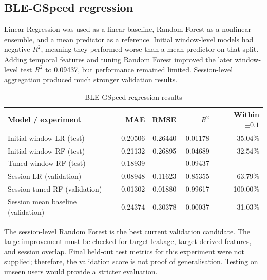 \documentclass[conference]{IEEEtran}
\begin{document}
\subsection{BLE-GSpeed regression}
Linear Regression was used as a linear baseline, Random Forest as a nonlinear ensemble, and a mean predictor as a reference. Initial window-level models had negative $R^2$, meaning they performed worse than a mean predictor on that split. Adding temporal features and tuning Random Forest improved the later window-level test $R^2$ to 0.09437, but performance remained limited. Session-level aggregation produced much stronger validation results.
\begin{table}[t]
\caption{BLE-GSpeed regression results}
\centering\scriptsize
\begin{tabular}{p{}rrrr}
\toprule Model / experiment & MAE & RMSE & $R^2$ & Within $\pm0.1$\\\midrule
Initial window LR (test) & 0.20506 & 0.26440 & -0.01178 & 35.04\%\\
Initial window RF (test) & 0.21132 & 0.26895 & -0.04689 & 32.54\%\\
Tuned window RF (test) & 0.18939 & -- & 0.09437 & --\\
Session LR (validation) & 0.08948 & 0.11623 & 0.85355 & 63.79\%\\
Session tuned RF (validation) & 0.01302 & 0.01880 & 0.99617 & 100.00\%\\
Session mean baseline (validation) & 0.24374 & 0.30378 & -0.00037 & 31.03\%\\
\bottomrule
\end{tabular}
\end{table}
The session-level Random Forest is the best current validation candidate. The large improvement must be checked for target leakage, target-derived features, and session overlap. Final held-out test metrics for this experiment were not supplied; therefore, the validation score is not proof of generalisation. Testing on unseen users would provide a stricter evaluation.
\end{document}
